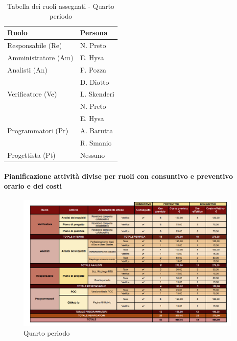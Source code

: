 \begin{table}[H]
    \centering
    \begin{tabular}{|L{4cm}|L{2cm}|}
    \hline
    \textbf{Ruolo} & \textbf{Persona} \\
    \hline
    \hline
    Responsabile (Re)   & N. Preto \\
    \hline
    Amministratore (Am) & E. Hysa \\
    \hline
    Analisti (An)       & F. Pozza \\
                        & D. Diotto \\
    \hline
    Verificatore (Ve)   & L. Skenderi \\
                        & N. Preto \\
                        & E. Hysa \\
     \hline
    Programmatori (Pr)  & A. Barutta \\
                        & R. Smanio \\
    \hline
    Progettista (Pt)    & Nessuno \\
    \hline
    \end{tabular}
    \caption{Tabella dei ruoli assegnati - Quarto periodo}
    \label{tab:Ruoli_persone_4}
    \end{table}
    
\newpage
\paragraph{Pianificazione attività divise per ruoli con consuntivo e preventivo orario e dei costi}

\begin{figure}[H]
    \centering
    \includegraphics[width=\linewidth, height=0.9\textheight, keepaspectratio]{../Images/tabG4.PNG}
    \caption{Quarto periodo}
    \label{fig:Quarto_periodo}
\end{figure}

